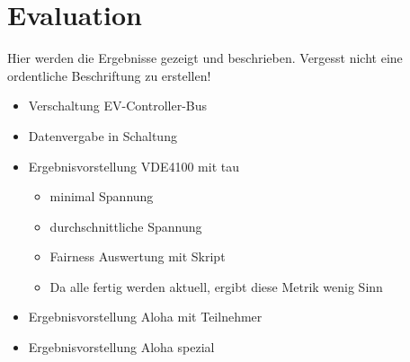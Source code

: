 \chapter{Evaluation}
Hier werden die Ergebnisse gezeigt und beschrieben. Vergesst nicht eine ordentliche Beschriftung zu erstellen!

\begin{itemize}
\item Verschaltung EV-Controller-Bus
\item Datenvergabe in Schaltung
\item Ergebnisvorstellung VDE4100 mit tau
\begin{itemize}
\item minimal Spannung
\item durchschnittliche Spannung
\item Fairness Auswertung mit Skript
\item Da alle fertig werden aktuell, ergibt diese Metrik wenig Sinn
\end{itemize}
\item Ergebnisvorstellung Aloha mit Teilnehmer
\item Ergebnisvorstellung Aloha spezial

\end{itemize}


